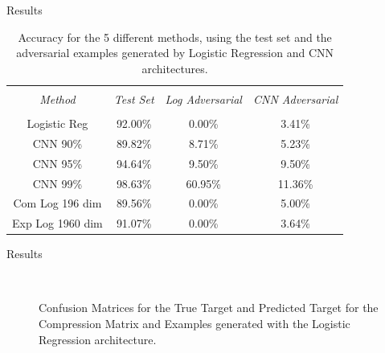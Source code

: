 \documentclass{beamer}
\begin{document}
	\begin{frame}{Results}
		\begin{table}
			\caption{\enspace Accuracy for the 5 different methods, using the test set and the adversarial examples generated by Logistic Regression and CNN architectures.}
			\label{tab1}
			\begin{tabular*}{\hsize}{@{\extracolsep{\fill}}cccc}
				\hline
				\\[-7pt]
				\multicolumn{1}{c}{\it Method}                    & 
				\multicolumn{1}{c}{\it Test Set}                  & 
				\multicolumn{1}{c}{\it Log Adversarial} & 
				\multicolumn{1}{c}{\it CNN Adversarial}      \\
				\hline
				\\[-5pt]
				Logistic Reg             & 92.00\% & 0.00\%  & 3.41\%  \\
				CNN 90\%                 & 89.82\% & 8.71\%  & 5.23\%  \\
				CNN 95\%                 & 94.64\% & 9.50\%  & 9.50\%  \\
				CNN 99\%                 & 98.63\% & 60.95\% & 11.36\% \\
				Com Log 196  dim         & 89.56\% & 0.00\%  & 5.00\%  \\
				Exp Log 1960 dim         & 91.07\% & 0.00\%  & 3.64\% 
			\end{tabular*}
		\end{table}
	\end{frame}
	
	\begin{frame}{Results}
		\begin{figure}[h!]
			\centering
			\caption{\enspace Confusion Matrices for the True Target and Predicted Target for the Compression Matrix and Examples generated with the Logistic Regression architecture.}
			   \\
		\end{figure}
	\end{frame}
	
\end{document}
